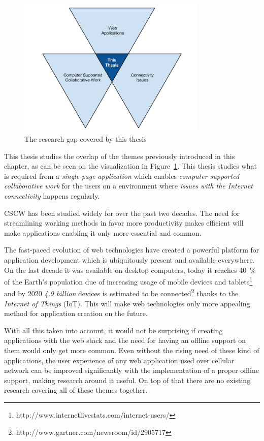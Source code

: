 \begin{figure}[t]
\begin{center}
\includegraphics[width=0.8\textwidth]{assets/researchgap.png}
\end{center}
\caption{The research gap covered by this thesis}
\label{fig:researchgap}
\end{figure}

This thesis studies the overlap of the themes previously introduced in this chapter, as can be seen on the visualization in Figure~\ref{fig:researchgap}. This thesis studies what is required from a \textit{single-page application} which enables \textit{computer supported collaborative work} for the users on a environment where \textit{issues with the Internet connectivity} happens regularly. 

CSCW has been studied widely for over the past two decades. The need for streamlining working methods in favor more productivity makes efficient will make applications enabling it only more essential and common.  

The fast-paced evolution of web technologies have created a powerful platform for application development which is ubiquitously present and available everywhere. On the last decade it was available on desktop computers, today it reaches 40~\% of the Earth's population due of increasing usage of mobile devices and tablets\footnote{http://www.internetlivestats.com/internet-users/} and by 2020 \textit{4.9 billion} devices is estimated to be connected\footnote{http://www.gartner.com/newsroom/id/2905717} thanks to the \textit{Internet of Things} (IoT). This will make web technologies only more appealing method for application creation on the future.

With all this taken into account, it would not be surprising if creating applications with the web stack and the need for having an offline support on them would only get more common. Even without the rising need of these kind of applications, the user experience of any web application used over cellular network can be improved significantly with the implementation of a proper offline support, making research around it useful. On top of that there are no existing research covering all of these themes together.









